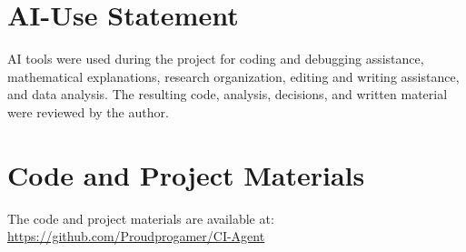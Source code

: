 \documentclass{article}
\begin{document}
\section*{AI-Use Statement}

AI tools were used during the project for coding and debugging assistance, mathematical explanations, research organization, editing and writing assistance, and data analysis. The resulting code, analysis, decisions, and written material were reviewed by the author.

\section*{Code and Project Materials}

The code and project materials are available at: \url{https://github.com/Proudprogamer/CI-Agent}



\end{document}
